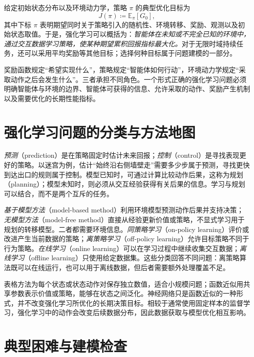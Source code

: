 给定初始状态分布以及环境动力学，策略 $\pi$ 的典型优化目标为
\begin{equation}
  J(\pi)
  \coloneqq
  \mathbb{E}_{\pi}\!\left[G_0\right],
  \label{eq:rl-objective}
\end{equation}
其中下标 $\pi$ 表明期望同时关于策略引入的随机性、环境转移、奖励、观测以及初始状态取值。于是，强化学习可以概括为：\emph{智能体在未知或不完全已知的环境中，通过交互数据学习策略，使某种期望累积回报指标最大化。}对于无限时域持续任务，还可以采用平均奖励等其他目标；选择何种目标属于问题建模的一部分。


\begin{remark}
奖励函数规定“希望实现什么”，策略规定“智能体如何行动”，环境动力学规定“采取动作之后会发生什么”。三者承担不同角色。一个形式正确的强化学习问题必须明确智能体与环境的边界、智能体可获得的信息、允许采取的动作、奖励产生机制以及需要优化的长期性能指标。
\end{remark}


\section{强化学习问题的分类与方法地图}

\emph{预测}（prediction）是在策略固定时估计未来回报；\emph{控制}（control）是寻找表现更好的策略。以迷宫为例，估计“始终沿右侧墙壁走”需要多少步属于预测，寻找更快到达出口的规则属于控制。模型已知时，可通过计算比较动作后果，这称为规划（planning）；模型未知时，则必须从交互经验获得有关后果的信息。学习与规划可以结合，而不是两个互斥的任务。

\emph{基于模型方法}（model-based method）利用环境模型预测动作后果并支持决策；\emph{无模型方法}（model-free method）直接从经验更新价值或策略，不显式学习用于规划的转移模型。二者都需要环境信息。\emph{同策略学习}（on-policy learning）评价或改进产生当前数据的策略；\emph{离策略学习}（off-policy learning）允许目标策略不同于行为策略。\emph{在线学习}（online learning）可以在学习过程中继续收集交互数据；\emph{离线学习}（offline learning）只使用给定数据集。这些分类回答不同问题：离策略算法既可以在线运行，也可以用于离线数据，但后者需要额外处理覆盖不足。

表格方法为每个状态或状态动作对保存独立数值，适合小规模问题；函数近似用共享参数表示价值或策略，能够在状态之间泛化。神经网络只是函数近似的一种形式，并不改变强化学习所优化的长期决策目标。相较于通常使用固定样本的监督学习，强化学习中的动作会改变后续数据分布，因此数据获取与模型优化相互影响。

\section{典型困难与建模检查}

